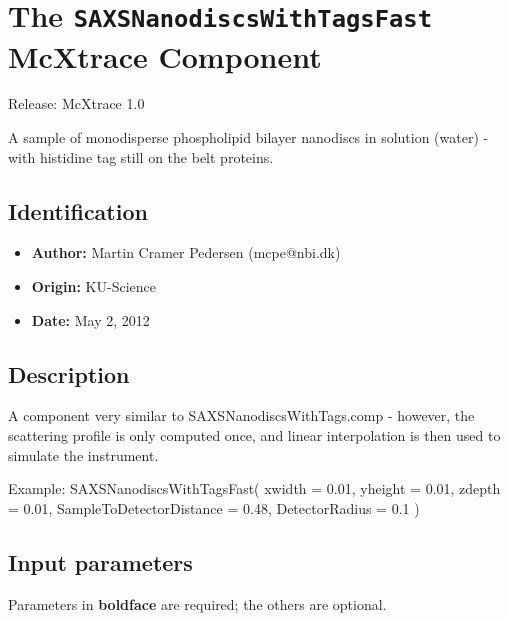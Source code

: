 \section{The \texttt{SAXSNanodiscsWithTagsFast} McXtrace Component}
Release: McXtrace 1.0

A sample of monodisperse phospholipid bilayer nanodiscs in solution (water) - with
histidine tag still on the belt proteins.

\subsection*{Identification}
\begin{itemize}
  \item \textbf{Author:} Martin Cramer Pedersen (mcpe@nbi.dk)
  \item \textbf{Origin:} KU-Science
  \item \textbf{Date:} May 2, 2012
\end{itemize}

\subsection*{Description}
A component very similar to SAXSNanodiscsWithTags.comp - however, the scattering profile is only computed once, and linear interpolation is then used to simulate the instrument.

Example: SAXSNanodiscsWithTagsFast( xwidth = 0.01, yheight = 0.01, zdepth = 0.01, SampleToDetectorDistance = 0.48, DetectorRadius = 0.1 )

\subsection*{Input parameters}
Parameters in \textbf{boldface} are required; the others are optional.


